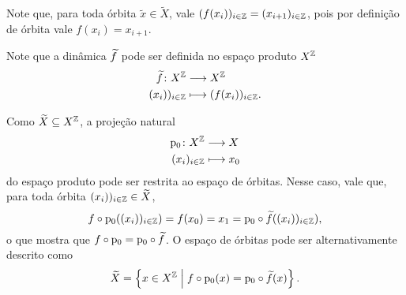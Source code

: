 Note que, para toda órbita $\widetilde{x} \in \widetilde{X}$, vale $(f(x_i))_{i \in \mathbb{Z}} = (x_{i+1})_{i \in \mathbb{Z}}$, pois por definição de órbita vale $f(x_i) = x_{i+1}$.

Note que a dinâmica $\widetilde{f}$ pode ser definida no espaço produto $X^{\mathbb{Z}}$
	\begin{align*}
	{\widetilde{f}}\colon {X^{\mathbb{Z}}} &\longrightarrow {X^{\mathbb{Z}}} \\{(x_i))_{i \in \mathbb{Z}}} &\longmapsto (f(x_i))_{i \in \mathbb{Z}}.
	\end{align*}

Como $\widetilde{X} \subseteq X^{\mathbb{Z}}$, a projeção natural
	\begin{align*}
	{\mathrm{p}_0}\colon {X^{\mathbb{Z}}} &\longrightarrow {X} \\{(x_i)_{i \in \mathbb{Z}}} &\longmapsto x_0
	\end{align*}
do espaço produto pode ser restrita ao espaço de órbitas. Nesse caso, vale que, para toda órbita $(x_i))_{i \in \mathbb{Z}} \in \widetilde{X}$,
	\begin{equation*}
	f \circ \mathrm{p}_0((x_i))_{i \in \mathbb{Z}}) = f(x_0) = x_1 = \mathrm{p}_0 \circ \widetilde{f} ((x_i))_{i \in \mathbb{Z}}),
	\end{equation*}
o que mostra que $f \circ \mathrm{p}_0 = \mathrm{p}_0 \circ \widetilde{f}$.
O espaço de órbitas pode ser alternativamente descrito como
	\begin{equation*}
	\widetilde{X} = \left\{{x \in X^{\mathbb{Z}}}\;\middle\vert\;{f \circ \mathrm{p}_0(x) = \mathrm{p}_0 \circ \widetilde{f} (x)}\right\}.
	\end{equation*}

\begin{comment}
\begin{definition}[Iterados, Órbitas e Periodicidade]
Seja $\Sist=(X,f)$ um sistema dinâmico.
	\begin{enumerate}
	\item O \emph{$t$-ésimo iterado} de um ponto $x \in X$, para $t \in T$, é o ponto $f^t(x)$;
	\item A \emph{órbita} de um ponto $x \in X$ é o conjunto
	\begin{equation*}
	\Orb(x) := \set{f^t(x)}{t \in T},
	\end{equation*}
a órbita de $x$ sob a ação de $f$; a \emph{(semi)órbita positiva} de $x$ é o conjunto $\Orb^+(x) := \set{f^t(x)}{t \in T^+}$ (em que $T^+$ é o monoide positivo associado a $\Z$ ou $\R$);
	\item Um ponto \emph{periódico} é um ponto $x \in X$ que satisfaz, para algum $t \in T$, $f^t(x)=x$, e $t$ é um \emph{período} de $x$; sua órbita é uma \emph{órbita periódica} (ou $t$-periódica). O conjunto dos pontos periódicos é denotado\footnote{Denotam-se $\Per(\Sist)$ ou $\Per(f)$ caso se queira ressaltar o sistema ou a dinâmica, respectivamente.} $\Per$ e o conjunto dos pontos $t$-periódicos é denotado $\Per[t]$.
	\end{enumerate}
\end{definition}
\end{comment}

